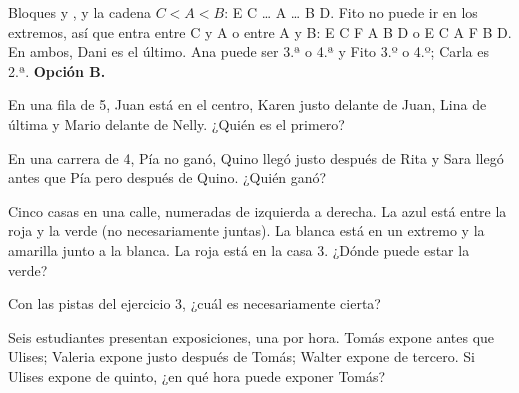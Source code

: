 \begin{retoresuelto}
Bloques  y , y la cadena $C < A < B$: \textsf{E C … A … B D}. Fito no puede ir en los extremos, así
que entra entre C y A o entre A y B: \textsf{E C F A B D} o \textsf{E C A F B D}. En ambos, Dani es el último.
Ana puede ser 3.ª o 4.ª y Fito 3.º o 4.º; Carla es 2.ª. \textbf{Opción B.}
\end{retoresuelto}

\taller
{}
\begin{ejercicios}
\item En una fila de 5, Juan está en el centro, Karen justo delante de Juan, Lina de última y Mario delante de Nelly. ¿Quién es el primero? 
\item En una carrera de 4, Pía no ganó, Quino llegó justo después de Rita y Sara llegó antes que Pía pero después de Quino. ¿Quién ganó? 
\item Cinco casas en una calle, numeradas de izquierda a derecha. La azul está entre la roja y la verde (no necesariamente juntas). La blanca está en un extremo y la amarilla junto a la blanca. La roja está en la casa 3. ¿Dónde puede estar la verde? 
\end{ejercicios}
\begin{ejercicios}
\item Con las pistas del ejercicio 3, ¿cuál es necesariamente cierta?
\item Seis estudiantes presentan exposiciones, una por hora. Tomás expone antes que Ulises; Valeria expone justo después de Tomás; Walter expone de tercero. Si Ulises expone de quinto, ¿en qué hora puede exponer Tomás?
\end{ejercicios}

